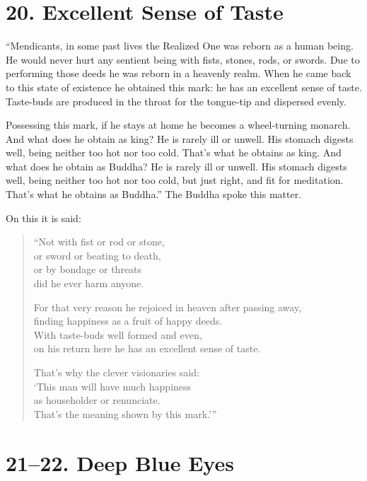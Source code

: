 \documentclass[12pt,openany]{book}%
\begin{document}
\section*{20. Excellent Sense of Taste }

“Mendicants, in some past lives the Realized One was reborn as a human being. He would never hurt any sentient being with fists, stones, rods, or swords. Due to performing those deeds he was reborn in a heavenly realm. When he came back to this state of existence he obtained this mark: he has an excellent sense of taste. Taste-buds are produced in the throat for the tongue-tip and dispersed evenly. 

Possessing this mark, if he stays at home he becomes a wheel-turning monarch. And what does he obtain as king? He is rarely ill or unwell. His stomach digests well, being neither too hot nor too cold. That’s what he obtains as king. And what does he obtain as Buddha? He is rarely ill or unwell. His stomach digests well, being neither too hot nor too cold, but just right, and fit for meditation. That’s what he obtains as Buddha.” The Buddha spoke this matter. 

On this it is said: 

\begin{verse}%
“Not with fist or rod or stone, \\
or sword or beating to death, \\
or by bondage or threats \\
did he ever harm anyone. 

For that very reason he rejoiced in heaven after passing away, \\
finding happiness as a fruit of happy deeds. \\
With taste-buds well formed and even, \\
on his return here he has an excellent sense of taste. 

That’s why the clever visionaries said: \\
‘This man will have much happiness \\
as householder or renunciate. \\
That’s the meaning shown by this mark.’” 

%
\end{verse}

\section*{21–22. Deep Blue Eyes }
\end{document}
